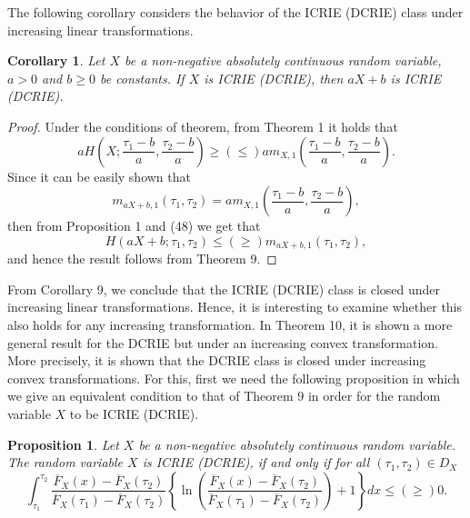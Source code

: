\documentclass[11pt]{article}
\newtheorem{proposition}{Proposition}
\newtheorem{corollary}{Corollary}
\begin{document}
The following corollary considers the behavior of the ICRIE (DCRIE) class under increasing linear transformations.

 
\begin{corollary} 
	Let $X$ be a non-negative absolutely continuous random variable, $a > 0$ and $b \geq 0$ be constants. If $X$ is ICRIE (DCRIE), then $aX + b$ is ICRIE (DCRIE).
\end{corollary}

\begin{proof} 
	Under the conditions of theorem, from Theorem 1 it holds that
	\begin{equation}
		\textstyle a H\left(X;\frac{\tau_1 - b}{a}, \frac{\tau_2 - b}{a} \right) \geq (\leq) a m_{X,1}\left(\frac{\tau_1 - b}{a}, \frac{\tau_2 - b}{a} \right).
	\end{equation}
	Since it can be easily shown that
	$$ \textstyle m_{aX+b,1}(\tau_1, \tau_2) = a m_{X,1}\left(\frac{\tau_1 - b}{a}, \frac{\tau_2 - b}{a} \right), $$
	then from Proposition 1 and (48) we get that 
	$$ \textstyle H(aX+b ;\tau_1,\tau_2 ) \leq (\geq) m_{aX+b,1}(\tau_1,\tau_2), $$
	and hence the result follows from Theorem 9.
\end{proof}

From Corollary 9, we conclude that the ICRIE (DCRIE) class is closed under increasing linear transformations. Hence, it is interesting to examine whether this also holds for any increasing transformation. In Theorem 10, it is shown a more general result for the DCRIE but under an increasing convex transformation. More precisely, it is shown that the DCRIE class is closed under increasing convex transformations. For this, first we need the following proposition in which we give an equivalent condition to that of Theorem 9 in order for the random variable $X$ to be ICRIE (DCRIE).

 
\begin{proposition}
	Let $X$ be a non-negative absolutely continuous random variable. The random variable $X$ is ICRIE (DCRIE), if and only if for all $(\tau_1,\tau_2)\in D_X$
	\begin{equation}
		\textstyle \int_{\tau_1}^{\tau_2} \frac{\overline{F}_X(x) - \overline{F}_X(\tau_2)}{\overline{F}_X(\tau_1) - \overline{F}_X(\tau_2)} \left\{ \ln \left( \frac{\overline{F}_X(x) - \overline{F}_X(\tau_2)}{\overline{F}_X(\tau_1) - \overline{F}_X(\tau_2)} \right) + 1 \right\} dx \leq (\geq) 0.
	\end{equation}
\end{proposition}
\end{document}
